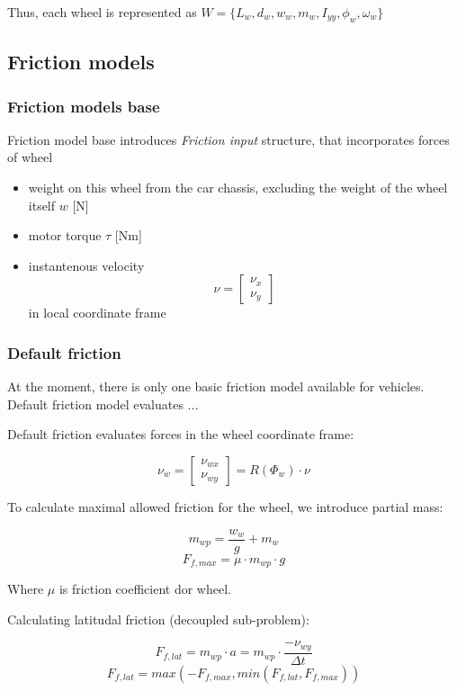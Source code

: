 \documentclass[a4paper,11pt]{article}
\begin{document}
Thus, each wheel is represented as $W = \{L_w, d_w, w_w, m_w, I_{yy}, \phi_w, \omega_w\}$

\subsection{Friction models}
\subsubsection{Friction models base}
Friction model base introduces \textit{Friction input} structure, that incorporates forces of wheel
\begin{itemize}
\item weight on this wheel from the car chassis, excluding the weight of the wheel itself $w$ [N]
\item motor torque $\tau$ [Nm]
\item instantenous velocity 
\[\nu = \begin{bmatrix}
\nu_x \\
\nu_y
\end{bmatrix}\] in local coordinate frame
\end{itemize}

\subsubsection{Default friction}
At the moment, there is only one basic friction model available for vehicles.
Default friction model evaluates ...

Default friction evaluates forces in the wheel coordinate frame:

\begin{center}
\[
\nu_w = 
\begin{bmatrix}
\nu_{wx} \\
\nu_{wy}
\end{bmatrix}
=R(\Phi_w) \cdot \nu
\]
\end{center}

To calculate maximal allowed friction for the wheel, we introduce partial mass:
\begin{center}
\[
m_{wp} = \frac{w_w}{g} + m_w
\]
\[
F_{f, max} = \mu \cdot m_{wp} \cdot g
\]
\end{center}
Where $\mu$ is friction coefficient dor wheel.

Calculating latitudal friction (decoupled sub-problem):
\begin{center}
\[
F_{f,lat} = m_{wp} \cdot a = m_{wp} \cdot \frac{-\nu_{wy}}{\Delta t}
\]
\[
F_{f,lat} = max(-F_{f,max}, min(F_{f,lat}, F_{f,max}))
\]
\end{center}
\end{document}
